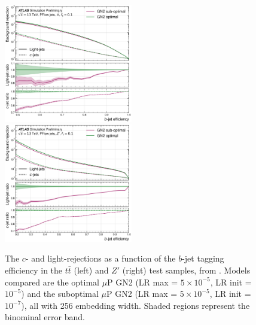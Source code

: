 \begin{center}
  \begin{figure}[h!]
  \centerline{
  \includegraphics[width=0.50\textwidth]{Images/FTAG/GN/HPO/thesis_roc/roc_ttbar.png}
  \includegraphics[width=0.50\textwidth]{Images/FTAG/GN/HPO/thesis_roc/roc_zp.png}
  }
  \caption{The $c$- and light-rejections as a function of the $b$-jet tagging efficiency in the $t\bar{t}$ (left) and $Z'$ (right) test samples, from \cite{publicplotMUP}. Models compared are the optimal $\mu$P GN2 (LR max = $5\times 10^{-5}$, LR init = $10^{-5}$) and the suboptimal $\mu$P GN2 (LR max = $5 \times 10^{-5}$, LR init = $10^{-7}$), all with 256 embedding width. Shaded regions represent the binominal error band.}
  \label{fig:rocmupGN2}
  \end{figure}
\end{center}

